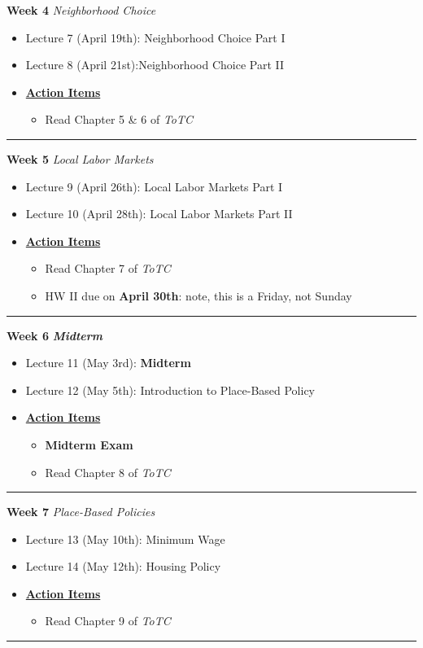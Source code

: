 \documentclass[11pt]{article}
\begin{document}
	
	\textbf{Week 4} \textit{Neighborhood Choice}
	
	\begin{itemize}
		\item Lecture 7 (April 19th): Neighborhood Choice Part I
		\item Lecture 8 (April 21st):Neighborhood Choice Part II
		\item[]\underline{\textbf{Action Items}}         
		\begin{itemize}                                  
			\item Read Chapter 5 \& 6 of \textit{ToTC}                 
		\end{itemize}
	\end{itemize}
	\noindent\rule[0.5ex]{\linewidth}{1pt}
	
	
	\textbf{Week 5} \textit{Local Labor Markets}
	
	\begin{itemize}
		\item  Lecture 9 (April 26th): Local Labor Markets Part I
		\item  Lecture 10 (April 28th):  Local Labor Markets Part II
		\item[]\underline{\textbf{Action Items}}
		\begin{itemize}
			\item Read Chapter 7 of \textit{ToTC}
			\item HW II due on \textbf{April 30th}: note, this is a Friday, not Sunday
			
		\end{itemize}
	\end{itemize}
	\noindent\rule[0.5ex]{\linewidth}{1pt}
	
	
	\textbf{Week 6} \textit{\textbf{Midterm}}
	\begin{itemize}
		\item Lecture 11 (May 3rd): \textbf{Midterm}
		\item Lecture 12 (May 5th): Introduction to Place-Based Policy
		\item[]\underline{\textbf{Action Items}}
		\begin{itemize}
			\item \textbf{Midterm Exam}
			\item Read Chapter 8 of \textit{ToTC}
		\end{itemize}
	\end{itemize}
	\noindent\rule[0.5ex]{\linewidth}{1pt}
	
	
	
	\textbf{Week 7} \textit{Place-Based Policies}
	\begin{itemize}
		\item Lecture 13 (May 10th): Minimum Wage
		\item Lecture 14 (May 12th): Housing Policy
		\item[]\underline{\textbf{Action Items}}
		\begin{itemize}
			\item Read Chapter 9 of \textit{ToTC}
		\end{itemize}
	\end{itemize}
	\noindent\rule[0.5ex]{\linewidth}{1pt}
	
\end{document}
